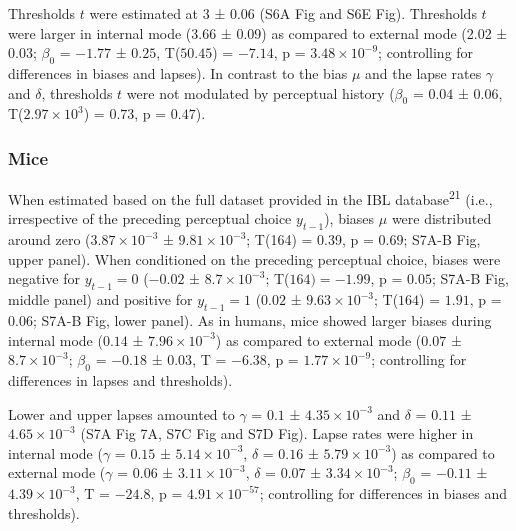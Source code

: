 \documentclass[
]{article}
\begin{document}
Thresholds \(t\) were estimated at 3 ± 0.06 (S6A Fig and
S6E Fig). Thresholds \(t\) were larger in internal mode (3.66 ± 0.09) as
compared to external mode (2.02 ± 0.03; \(\beta_0\) = \(-1.77\) ±
\(0.25\), T(\(50.45\)) = \(-7.14\), p =
\(\ensuremath{3.48\times 10^{-9}}\); controlling for differences in
biases and lapses). In contrast to the bias \(\mu\) and the lapse rates
\(\gamma\) and \(\delta\), thresholds \(t\) were not modulated by
perceptual history (\(\beta_0\) = \(0.04\) ± \(0.06\),
T(\(\ensuremath{2.97\times 10^{3}}\)) = \(0.73\), p = \(0.47\)).

\hypertarget{mice}{%
\subsubsection{Mice}\label{mice}}

When estimated based on the full dataset provided in the IBL
database\textsuperscript{21} (i.e., irrespective of the preceding
perceptual choice \(y_{t-1}\)), biases \(\mu\) were distributed around
zero (\(\ensuremath{3.87\times 10^{-3}}\) ±
\(\ensuremath{9.81\times 10^{-3}}\); T(164) = 0.39, p = \(0.69\);
S7A-B Fig, upper panel). When conditioned on the
preceding perceptual choice, biases were negative for \(y_{t-1} = 0\)
(\(-0.02\) ± \(\ensuremath{8.7\times 10^{-3}}\); T(\(164) = -1.99\), p =
\(0.05\); S7A-B Fig, middle panel) and positive for
\(y_{t-1} = 1\) (\(0.02\) ± \(\ensuremath{9.63\times 10^{-3}}\);
T(\(164\)) = \(1.91\), p = \(0.06\); S7A-B Fig, lower
panel). As in humans, mice showed larger biases during internal mode
(\(0.14\) ± \(\ensuremath{7.96\times 10^{-3}}\)) as compared to external
mode (\(0.07\) ± \(\ensuremath{8.7\times 10^{-3}}\); \(\beta_0\) =
\(-0.18\) ± \(0.03\), T = \(-6.38\), p =
\(\ensuremath{1.77\times 10^{-9}}\); controlling for differences in
lapses and thresholds).

Lower and upper lapses amounted to \(\gamma\) = \(0.1\) ±
\(\ensuremath{4.35\times 10^{-3}}\) and \(\delta\) = \(0.11\) ±
\(\ensuremath{4.65\times 10^{-3}}\) (S7A Fig 7A, S7C Fig and S7D Fig).
Lapse rates were higher in internal mode (\(\gamma\) = \(0.15\) ±
\(\ensuremath{5.14\times 10^{-3}}\), \(\delta\) = \(0.16\) ±
\(\ensuremath{5.79\times 10^{-3}}\)) as compared to external mode
(\(\gamma\) = \(0.06\) ± \(\ensuremath{3.11\times 10^{-3}}\), \(\delta\)
= \(0.07\) ± \(\ensuremath{3.34\times 10^{-3}}\); \(\beta_0\) =
\(-0.11\) ± \(\ensuremath{4.39\times 10^{-3}}\), T = \(-24.8\), p =
\(\ensuremath{4.91\times 10^{-57}}\); controlling for differences in
biases and thresholds).
\end{document}
